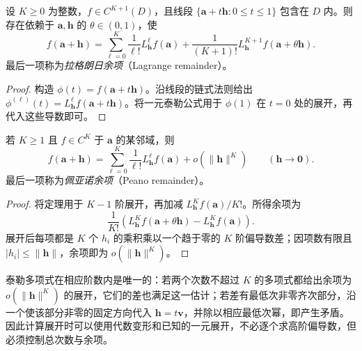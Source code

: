 \begin{theorem}[带拉格朗日余项的多元泰勒公式]
\label{thm:multivariable-taylor-lagrange-ch14}
设 $K\geq0$ 为整数，$f\in C^{K+1}(D)$，且线段 $\{\boldsymbol a+t\boldsymbol h:0\leq t\leq1\}$ 包含在 $D$ 内。则存在依赖于 $\boldsymbol a,\boldsymbol h$ 的 $\theta\in(0,1)$，使
\begin{equation}
\label{eq:multivariable-taylor-lagrange-ch14}
    f(\boldsymbol a+\boldsymbol h)
    =\sum_{\ell=0}^K\frac1{\ell!}L_{\boldsymbol h}^{\ell}f(\boldsymbol a)
      +\frac1{(K+1)!}L_{\boldsymbol h}^{K+1}f(\boldsymbol a+\theta\boldsymbol h).
\end{equation}
最后一项称为\emph{拉格朗日余项}（Lagrange remainder）。
\end{theorem}
\begin{proof}
构造 $\phi(t)=f(\boldsymbol a+t\boldsymbol h)$。沿线段的链式法则给出 $\phi^{(\ell)}(t)=L_{\boldsymbol h}^{\ell}f(\boldsymbol a+t\boldsymbol h)$。将一元泰勒公式用于 $\phi(1)$ 在 $t=0$ 处的展开，再代入这些导数即可。
\end{proof}

\begin{corollary}[带佩亚诺余项的多元泰勒公式]
\label{cor:multivariable-taylor-peano-ch14}
若 $K\geq1$ 且 $f\in C^K$ 于 $\boldsymbol a$ 的某邻域，则
\begin{equation}
\label{eq:multivariable-taylor-peano-ch14}
    f(\boldsymbol a+\boldsymbol h)
    =\sum_{\ell=0}^K\frac1{\ell!}L_{\boldsymbol h}^{\ell}f(\boldsymbol a)
       +o(\|\boldsymbol h\|^K)\qquad(\boldsymbol h\to\boldsymbol0).
\end{equation}
最后一项称为\emph{佩亚诺余项}（Peano remainder）。
\end{corollary}
\begin{proof}
将定理用于 $K-1$ 阶展开，再加减 $L_{\boldsymbol h}^Kf(\boldsymbol a)/K!$。所得余项为
\[
    \frac1{K!}\left(
       L_{\boldsymbol h}^Kf(\boldsymbol a+\theta\boldsymbol h)
       -L_{\boldsymbol h}^Kf(\boldsymbol a)\right).
\]
展开后每项都是 $K$ 个 $h_i$ 的乘积乘以一个趋于零的 $K$ 阶偏导数差；因项数有限且 $|h_i|\leq\|\boldsymbol h\|$，余项即为 $o(\|\boldsymbol h\|^K)$。
\end{proof}

泰勒多项式在相应阶数内是唯一的：若两个次数不超过 $K$ 的多项式都给出余项为 $o(\|\boldsymbol h\|^K)$ 的展开，它们的差也满足这一估计；若差有最低次非零齐次部分，沿一个使该部分非零的固定方向代入 $\boldsymbol h=t\boldsymbol v$，并除以相应最低次幂，即产生矛盾。因此计算展开时可以使用代数变形和已知的一元展开，不必逐个求高阶偏导数，但必须控制总次数与余项。

